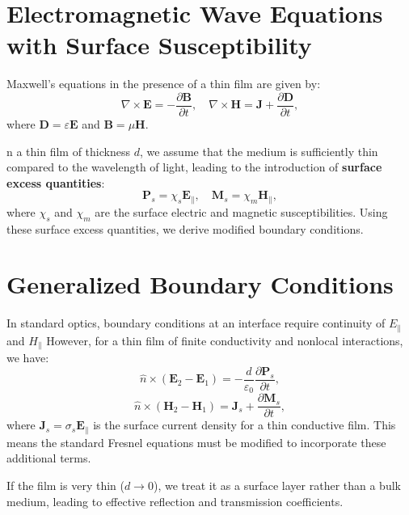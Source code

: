 \documentclass{article}
\begin{document}
	\section{Electromagnetic Wave Equations with Surface Susceptibility}
	Maxwell’s equations in the presence of a thin film are given by:
	\begin{equation}
		\nabla \times \mathbf{E} = -\frac{\partial \mathbf{B}}{\partial t}, \quad
		\nabla \times \mathbf{H} = \mathbf{J} + \frac{\partial \mathbf{D}}{\partial t},
	\end{equation}
	where $\mathbf{D} = \varepsilon \mathbf{E}$ and $\mathbf{B} = \mu \mathbf{H}$.
	
	n a thin film of thickness $d$, we assume that the medium is sufficiently thin compared to the wavelength of light, leading to the introduction of \textbf{surface excess quantities}:
	\begin{equation}
		\mathbf{P}_s = \chi_s \mathbf{E}_\parallel, \quad \mathbf{M}_s = \chi_m \mathbf{H}_\parallel,
	\end{equation}
	where $\chi_s$ and $\chi_m$ are the surface electric and magnetic susceptibilities. Using these surface excess quantities, we derive modified boundary conditions.
	
	\section{Generalized Boundary Conditions}
	In standard optics, boundary conditions at an interface require continuity of $E_\parallel$ and $H_\parallel$ However, for a thin film of finite conductivity and nonlocal interactions, we have:
	\begin{equation}
		\hat{n} \times (\mathbf{E}_2 - \mathbf{E}_1) = - \frac{d}{\varepsilon_0} \frac{\partial \mathbf{P}_s}{\partial t},
	\end{equation}
	\begin{equation}
		\hat{n} \times (\mathbf{H}_2 - \mathbf{H}_1) = \mathbf{J}_s + \frac{\partial \mathbf{M}_s}{\partial t},
	\end{equation}
	where $\mathbf{J}_s = \sigma_s \mathbf{E}_\parallel$ is the surface current density for a thin conductive film. This means the standard Fresnel equations must be modified to incorporate these additional terms.
	
	If the film is very thin ($d\to 0$), we treat it as a surface layer rather than a bulk medium, leading to effective reflection and transmission coefficients.
	
\end{document}
